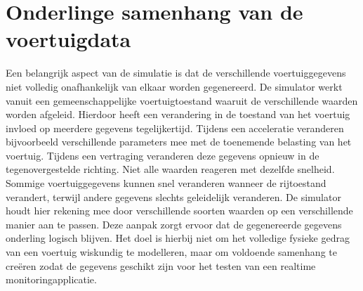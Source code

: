 \section{Onderlinge samenhang van de voertuigdata}
Een belangrijk aspect van de simulatie is dat de verschillende voertuiggegevens niet volledig onafhankelijk van elkaar worden gegenereerd. De simulator werkt vanuit een gemeenschappelijke voertuigtoestand waaruit de verschillende waarden worden afgeleid.
Hierdoor heeft een verandering in de toestand van het voertuig invloed op meerdere gegevens tegelijkertijd. Tijdens een acceleratie veranderen bijvoorbeeld verschillende parameters mee met de toenemende belasting van het voertuig. Tijdens een vertraging veranderen deze gegevens opnieuw in de tegenovergestelde richting.
Niet alle waarden reageren met dezelfde snelheid. Sommige voertuiggegevens kunnen snel veranderen wanneer de rijtoestand verandert, terwijl andere gegevens slechts geleidelijk veranderen. De simulator houdt hier rekening mee door verschillende soorten waarden op een verschillende manier aan te passen.
Deze aanpak zorgt ervoor dat de gegenereerde gegevens onderling logisch blijven. Het doel is hierbij niet om het volledige fysieke gedrag van een voertuig wiskundig te modelleren, maar om voldoende samenhang te creëren zodat de gegevens geschikt zijn voor het testen van een realtime monitoringapplicatie.

